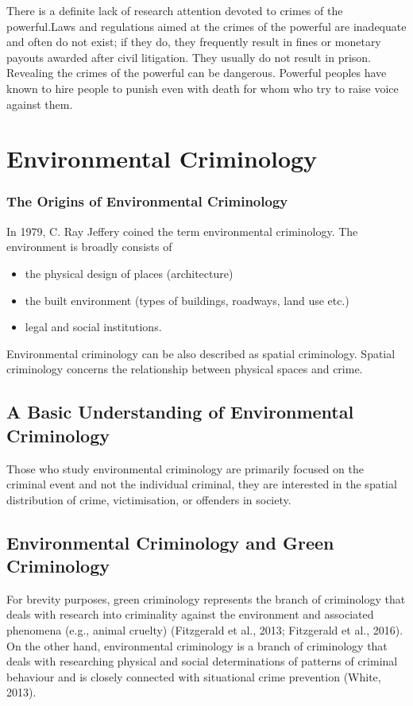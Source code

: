 \documentclass{article}
\begin{document}
There is a definite lack of research attention devoted to crimes of the powerful.Laws and regulations aimed at the crimes of the powerful are inadequate and often do not exist; if they do, they frequently result in fines or monetary payouts awarded after civil litigation. They usually do not result in prison. Revealing the crimes of the powerful can be dangerous. Powerful peoples have known to hire people to punish even with death for whom who try to raise voice against them.

\section{Environmental Criminology}

\subsubsection*{The Origins of Environmental Criminology}

In 1979, C. Ray Jeffery coined the term environmental criminology. The environment is broadly consists of 

\begin{itemize}
    \item the physical design of places (architecture)
    \item the built environment (types of buildings, roadways, land use etc.)
    \item legal and social institutions.
\end{itemize}

Environmental criminology can be also described as spatial criminology. Spatial criminology concerns the relationship between physical spaces and crime.

\subsection{A Basic Understanding of Environmental Criminology}

Those who study environmental criminology are primarily focused on the criminal event and not the individual criminal, they are interested in the spatial distribution of crime, victimisation, or offenders in society.

\subsection{Environmental Criminology and Green Criminology}

For brevity purposes, green criminology represents the branch of criminology that deals with research into criminality against the environment and associated phenomena (e.g., animal cruelty) (Fitzgerald et al., 2013; Fitzgerald et al., 2016). On the other hand, environmental criminology is a branch of criminology that deals with researching physical and social determinations of patterns of criminal behaviour and is closely connected with situational crime prevention (White, 2013).
\end{document}
